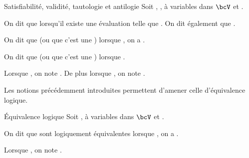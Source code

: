     \begin{definition}{Satisfiabilité, validité, tautologie et antilogie}{}
        Soit , ,  à variables dans $\bcV$ et .
        \begin{enumerate}
            \itast On dit que  lorsqu'il existe une évaluation  telle que . On dit également que .
            
            \itast On dit que  (ou que c'est une ) lorsque , on a .
            
            \itast On dit que  (ou que c'est une ) lorsque .
        \end{enumerate}
    \end{definition}
    \begin{notation}
        Lorsque , on note \hg{$\bcv \vdash \varphi$}. De plus lorsque , on note \hg{$\vdash \varphi$}.
    \end{notation}
    
    Les notions précédemment introduites permettent d'amener celle d'équivalence logique.
    
    \begin{definition}{Équivalence logique}{}
        Soit ,  à variables dans $\bcV$ et .
        
        On dit que  sont logiquement équivalentes lorsque , on a \hg{$\bcv\p{\varphi} = \bcv\p{\psi}$}.
    \end{definition}
    
    \begin{notation}
        Lorsque , on note \hg{$\varphi \equiv \psi$}.
    \end{notation}
    
